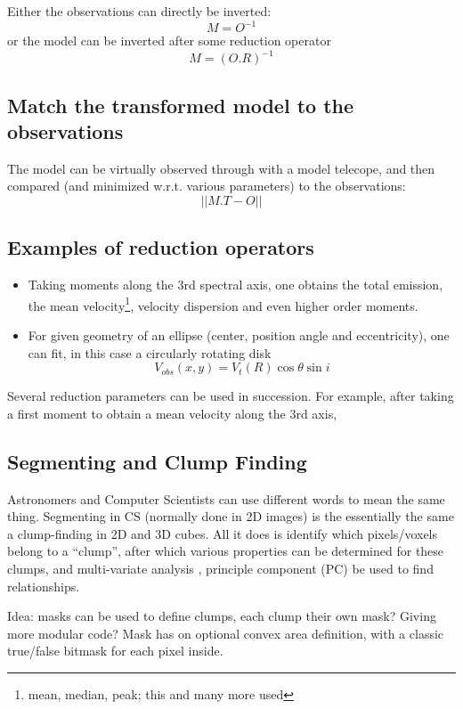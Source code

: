 \documentclass[preprint]{aastex} %
\begin{document}
Either the observations can directly be inverted:
$$
    M = O^{-1}
$$
or the model can be inverted after some reduction operator
$$
    M = (O.R)^{-1}
$$

\subsection{Match the transformed model to the observations}

The model can be virtually observed through with a model telecope,
and then compared (and minimized w.r.t. various parameters)
to the observations:
$$
     || M . T -  O ||
$$



\subsection{Examples of reduction operators}


\begin{itemize}
\item
Taking moments along the 3rd spectral axis, one obtains the total emission,
the mean velocity\footnote{mean, median, peak; this and many more used},
velocity dispersion and even higher order moments.

\item
For given geometry of an ellipse (center, position angle and eccentricity),
one can fit, in this case a circularly rotating disk
$$
     V_{obs}(x,y) = V_t(R) \cos{\theta} \sin{i}
$$

\end{itemize}

Several reduction parameters can be used in succession. For example, after
taking a first moment to obtain a mean velocity along the 3rd axis, 

\subsection{Segmenting and Clump Finding}

Astronomers and Computer Scientists can use different words to mean the same
thing. Segmenting in CS (normally done in 2D images) is the essentially 
the same a clump-finding in 2D and 3D cubes. All it does is identify which
pixels/voxels belong to a ``clump'', after which various properties can be
determined for these clumps, and multi-variate analysis , principle component (PC)
be used to find relationships.

Idea: masks can be used to define clumps, each clump their own mask? Giving more
modular code? Mask has on optional convex area definition, with a classic 
true/false bitmask for each pixel inside.
\end{document}
